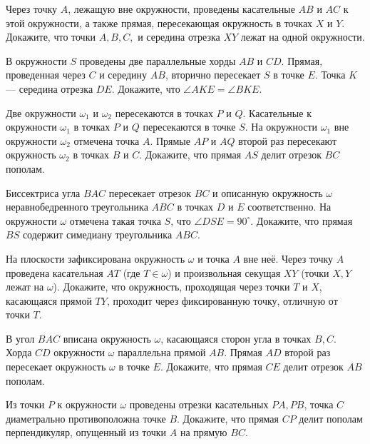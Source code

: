 \documentclass{article}
\begin{document}
\begin{enumerate_boxed}
        \item Через точку $A$, лежащую вне окружности, проведены касательные $AB$ и $AC$ к этой окружности, а также прямая, пересекающая окружность в точках $X$ и $Y$.
        Докажите, что точки $A, B, C,$ и середина отрезка $XY$ лежат на одной окружности.

        \item В окружности $S$ проведены две параллельные хорды $AB$ и $CD$.
        Прямая, проведенная через $C$ и середину $AB$, вторично пересекает $S$ в точке $E$.
        Точка $K$ — середина отрезка $DE$.
        Докажите, что $\angle AKE = \angle BKE.$

        \item Две окружности $\omega_1$ и $\omega_2$ пересекаются в точках $P$ и $Q$.
        Касательные к окружности $\omega_1$ в точках $P$ и $Q$ пересекаются в точке $S$.
        На окружности $\omega_1$ вне окружности $\omega_2$ отмечена точка $A$.
        Прямые $AP$ и $AQ$ второй раз пересекают окружность $\omega_2$ в точках $B$ и $C$.
        Докажите, что прямая $AS$ делит отрезок $BC$ пополам.

        \item Биссектриса угла $BAC$ пересекает отрезок $BC$ и описанную окружность $\omega$ неравнобедренного треугольника $ABC$ в точках $D$ и $E$ соответственно.
        На окружности $\omega$ отмечена такая точка $S$, что $\angle DSE = 90^\circ$.
        Докажите, что прямая $BS$ содержит симедиану треугольника $ABC$.

        \item На плоскости зафиксирована окружность $\omega$ и точка $A$ вне неё.
        Через точку $A$
        проведена касательная $AT$ (где $T \in \omega$) и произвольная секущая $XY$ (точки $X, Y$
        лежат на $\omega$). Докажите, что окружность, проходящая через точки $T$ и $X$, касающаяся прямой $TY$, проходит через фиксированную точку, отличную от точки $T$.

        \item В угол $BAC$ вписана окружность $\omega$, касающаяся сторон угла в точках $B, C$.
        Хорда $CD$ окружности $\omega$ параллельна прямой $AB$.
        Прямая $AD$ второй раз пересекает окружность $\omega$ в точке $E$.
        Докажите, что прямая $CE$ делит отрезок $AB$ пополам.

        \item Из точки $P$ к окружности $\omega$ проведены отрезки касательных $PA, PB$, точка $C$ диаметрально противоположна точке $B$.
        Докажите, что прямая $CP$ делит пополам перпендикуляр, опущенный из точки $A$ на прямую $BC$.


\end{enumerate_boxed}
\end{document}

